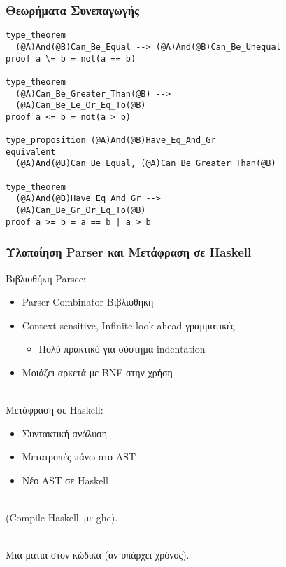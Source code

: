 \documentclass{beamer}
\def\e{\foreignlanguage{english}}
\def\h{\e{Haskell}}
\begin{document}
\begin{frame}[fragile]

\frametitle{Θεωρήματα Συνεπαγωγής}

\begin{otherlanguage}{english}
\begin{verbatim}
type_theorem
  (@A)And(@B)Can_Be_Equal --> (@A)And(@B)Can_Be_Unequal
proof a \= b = not(a == b)

type_theorem
  (@A)Can_Be_Greater_Than(@B) -->
  (@A)Can_Be_Le_Or_Eq_To(@B)
proof a <= b = not(a > b)

type_proposition (@A)And(@B)Have_Eq_And_Gr
equivalent
  (@A)And(@B)Can_Be_Equal, (@A)Can_Be_Greater_Than(@B)

type_theorem
  (@A)And(@B)Have_Eq_And_Gr -->
  (@A)Can_Be_Gr_Or_Eq_To(@B)
proof a >= b = a == b | a > b

\end{verbatim}
\end{otherlanguage}

\end{frame}

\begin{frame}

\frametitle{Υλοποίηση \e{Parser} και Μετάφραση σε \h}

Βιβλιοθήκη \e{Parsec}:

\begin{itemize}
\item \e{Parser Combinator} Βιβλιοθήκη
\item \e{Context-sensitive, Infinite look-ahead} γραμματικές
\begin{itemize}
\item Πολύ πρακτικό για σύστημα \e{indentation}
\end{itemize}
\item Μοιάζει αρκετά με \e{BNF} στην χρήση
\\~\
\end{itemize}

Μετάφραση σε \h:
\begin{itemize}
\item Συντακτική ανάλυση
\item Μετατροπές πάνω στο \e{AST}
\item Νέο \e{AST} σε \h
\\~\
\end{itemize}

(\e{Compile} \h\ με \e{ghc}).
\\~\

Μια ματιά στον κώδικα (αν υπάρχει χρόνος).
\end{frame}
\end{document}
